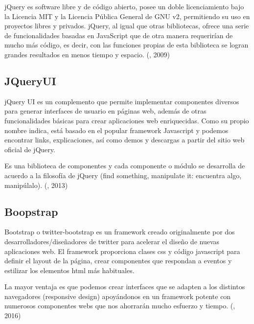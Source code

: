 jQuery es software libre y de código abierto, posee un doble licenciamiento bajo la Licencia MIT y la Licencia Pública General de GNU v2, permitiendo su uso en proyectos libres y privados. jQuery, al igual que otras bibliotecas, ofrece una serie de funcionalidades basadas en JavaScript que de otra manera requerirían de mucho más código, es decir, con las funciones propias de esta biblioteca se logran grandes resultados en menos tiempo y espacio.
\setlength{\parskip}{0mm}
(\citet{jquerybib}, 2009)

\subsection{JQueryUI}
\setlength{\parskip}{5mm}
jQuery UI es un complemento que permite implementar componentes diversos para generar interfaces de usuario en páginas web, además de otras funcionalidades básicas para crear aplicaciones web enriquecidas. Como su propio nombre indica, está basado en el popular framework Javascript y podemos encontrar links, explicaciones, así como demos y descargas a partir del sitio web oficial de jQuery.

Es una biblioteca de componentes y cada componente o módulo se desarrolla de acuerdo a la filosofía de jQuery (find something, manipulate it: encuentra algo, manipúlalo).
\setlength{\parskip}{0mm}
(\citet{jqueryuibib}, 2013)

\subsection{Boopstrap}
\setlength{\parskip}{5mm}
Bootstrap o twitter-bootstrap es un framework creado originalmente por dos desarrolladores/diseñadores de twitter para acelerar el diseño de nuevas aplicaciones web.
El framework proporciona clases css y código javascript para definir el layout de la página, crear componentes que respondan a eventos y estilizar los elementos html más habituales.

La mayor ventaja es que podemos crear interfaces que se adapten a los distintos navegadores (responsive design) apoyándonos en un framework potente con numerosos componentes webs que nos ahorrarán mucho esfuerzo y tiempo. (\citet{bootstrap}, 2016)

